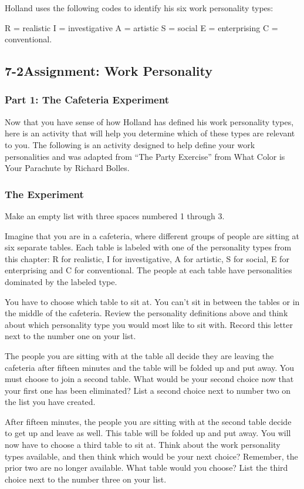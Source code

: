 Holland uses the following codes to identify his six work personality types:

R = realistic
\break I = investigative
\break A = artistic
\break S = social
\break E = enterprising
\break C = conventional.
\pagebreak \subsection*{7-2\quad Assignment: Work Personality}
\subsubsection*{Part 1: The Cafeteria Experiment}
Now that you have sense of how Holland has defined his work personality types, here is an activity that will help you determine which of these types are relevant to you. The following is an activity designed to help define your work personalities and was adapted from ``The Party Exercise'' from What Color is Your Parachute by Richard Bolles.

\subsubsection*{The Experiment}

Make an empty list with three spaces numbered 1 through 3.

Imagine that you are in a cafeteria, where different groups of people are sitting at six separate tables. Each table is labeled with one of the personality types from this chapter: R for realistic, I for investigative, A for artistic, S for social, E for enterprising and C for conventional. The people at each table have personalities dominated by the labeled type.

You have to choose which table to sit at. You can't sit in between the tables or in the middle of the cafeteria. Review the personality definitions above and think about which personality type you would most like to sit with. Record this letter next to the number one on your list.

The people you are sitting with at the table all decide they are leaving the cafeteria after fifteen minutes and the table will be folded up and put away. You must choose to join a second table. What would be your second choice now that your first one has been eliminated? List a second choice next to number two on the list you have created.

After fifteen minutes, the people you are sitting with at the second table decide to get up and leave as well. This table will be folded up and put away. You will now have to choose a third table to sit at. Think about the work personality types available, and then think which would be your next choice? Remember, the prior two are no longer available. What table would you choose? List the third choice next to the number three on your list.

